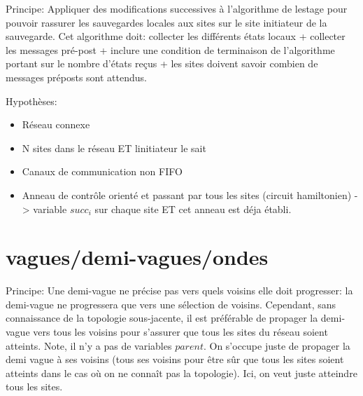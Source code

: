 \documentclass[a4paper,11pt]{article}
\begin{document}
\newpage
Principe: Appliquer des modifications successives à l'algorithme de lestage pour pouvoir rassurer les sauvegardes locales aux sites sur le site initiateur de la sauvegarde. Cet algorithme doit: collecter les différents états locaux + collecter les messages pré-post + inclure une condition de terminaison de l'algorithme portant sur le nombre d'états reçus + les sites doivent savoir combien de messages préposts sont attendus.

Hypothèses:
\begin{itemize}
    \item Réseau connexe
    \item N sites dans le réseau ET linitiateur le sait
    \item Canaux de communication non FIFO
    \item Anneau de contrôle orienté et passant par tous les sites (circuit hamiltonien) -> variable $succ_i$ sur chaque site ET cet anneau est déja établi.
\end{itemize}

\newpage
\section{vagues/demi-vagues/ondes}

Principe: Une demi-vague ne précise pas vers quels voisins elle doit progresser: la demi-vague ne progressera que vers une sélection de voisins. Cependant, sans connaissance de la topologie sous-jacente, il est préférable de propager la demi-vague vers tous les voisins pour s’assurer que tous les sites du réseau soient atteints. Note, il n’y a pas de variables $parent$. On s’occupe juste de 
propager la demi vague à ses voisins (tous ses voisins pour être sûr que tous les sites soient atteints dans le cas où on ne connaît pas la topologie). Ici, on veut juste atteindre tous les sites.

\end{document}
